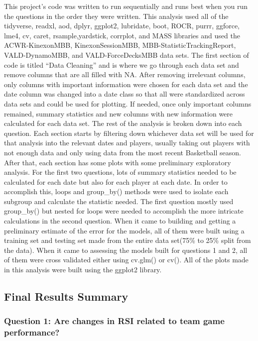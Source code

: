 \documentclass[
]{article}
\begin{document}
This project's code was written to run sequentially and runs best when
you run the questions in the order they were written. This analysis used
all of the tidyverse, readxl, aod, dplyr, ggplot2, lubridate, boot,
ROCR, purrr, ggforce, lme4, cv, caret, rsample,yardstick, corrplot, and
MASS libraries and used the ACWR-KinexonMBB, KinexonSessionMBB,
MBB-StatisticTrackingReport, VALD-DynamoMBB, and VALD-ForceDecksMBB data
sets. The first section of code is titled ``Data Cleaning'' and is where
we go through each data set and remove columns that are all filled with
NA. After removing irrelevant columns, only columns with important
information were chosen for each data set and the date column was
changed into a date class so that all were standardized across data sets
and could be used for plotting. If needed, once only important columns
remained, summary statistics and new columns with new information were
calculated for each data set. The rest of the analysis is broken down
into each question. Each section starts by filtering down whichever data
set will be used for that analysis into the relevant dates and players,
usually taking out players with not enough data and only using data from
the most recent Basketball season. After that, each section has some
plots with some preliminary exploratory analysis. For the first two
questions, lots of summary statistics needed to be calculated for each
date but also for each player at each date. In order to accomplish this,
loops and group\_by() methods were used to isolate each subgroup and
calculate the statistic needed. The first question mostly used
group\_by() but nested for loops were needed to accomplish the more
intricate calculations in the second question. When it came to building
and getting a preliminary estimate of the error for the models, all of
them were built using a training set and testing set made from the
entire data set(75\% to 25\% split from the data). When it came to
assessing the models built for questions 1 and 2, all of them were cross
validated either using cv.glm() or cv(). All of the plots made in this
analysis were built using the ggplot2 library.

\subsection{Final Results Summary}\label{final-results-summary}

\subsubsection{Question 1: Are changes in RSI related to team game
performance?}\label{question-1-are-changes-in-rsi-related-to-team-game-performance-1}
\end{document}

